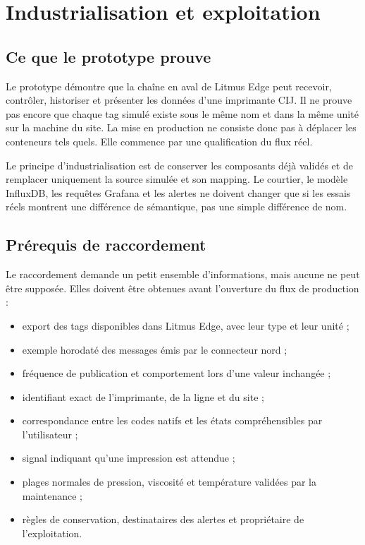 \chapter{Industrialisation et exploitation}

\section{Ce que le prototype prouve}

Le prototype démontre que la chaîne en aval de Litmus Edge peut recevoir,
contrôler, historiser et présenter les données d'une imprimante CIJ. Il ne
prouve pas encore que chaque tag simulé existe sous le même nom et dans la même
unité sur la machine du site. La mise en production ne consiste donc pas à
déplacer les conteneurs tels quels. Elle commence par une qualification du
flux réel.

Le principe d'industrialisation est de conserver les composants déjà validés
et de remplacer uniquement la source simulée et son mapping. Le courtier, le
modèle InfluxDB, les requêtes Grafana et les alertes ne doivent changer que si
les essais réels montrent une différence de sémantique, pas une simple
différence de nom.

\section{Prérequis de raccordement}

Le raccordement demande un petit ensemble d'informations, mais aucune ne peut
être supposée. Elles doivent être obtenues avant l'ouverture du flux de
production :

\begin{itemize}
  \item export des tags disponibles dans Litmus Edge, avec leur type et leur
        unité ;
  \item exemple horodaté des messages émis par le connecteur nord ;
  \item fréquence de publication et comportement lors d'une valeur inchangée ;
  \item identifiant exact de l'imprimante, de la ligne et du site ;
  \item correspondance entre les codes natifs et les états compréhensibles par
        l'utilisateur ;
  \item signal indiquant qu'une impression est attendue ;
  \item plages normales de pression, viscosité et température validées par la
        maintenance ;
  \item règles de conservation, destinataires des alertes et propriétaire de
        l'exploitation.
\end{itemize}

